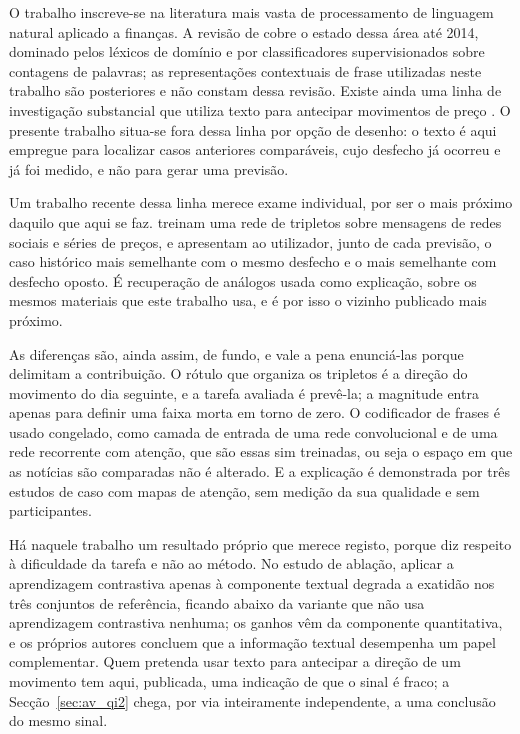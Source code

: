 O trabalho inscreve-se na literatura mais vasta de processamento de linguagem natural aplicado a
finanças. A revisão de \textcite{kearney2014textual} cobre o estado dessa área até 2014, dominado
pelos léxicos de domínio e por classificadores supervisionados sobre contagens de palavras; as
representações contextuais de frase utilizadas neste trabalho são posteriores e não constam dessa
revisão. Existe ainda uma linha de investigação substancial que utiliza texto para antecipar
movimentos de preço \autocite{xing2018nlffsurvey, ding2015deep}. O presente trabalho situa-se fora
dessa linha por opção de desenho: o texto é aqui empregue para localizar casos anteriores
comparáveis, cujo desfecho já ocorreu e já foi medido, e não para gerar uma previsão.

Um trabalho recente dessa linha merece exame individual, por ser o mais próximo daquilo que aqui
se faz. \textcite{du2024contrastive} treinam uma rede de tripletos sobre mensagens de redes
sociais e séries de preços, e apresentam ao utilizador, junto de cada previsão, o caso histórico
mais semelhante com o mesmo desfecho e o mais semelhante com desfecho oposto. É recuperação de
análogos usada como explicação, sobre os mesmos materiais que este trabalho usa, e é por isso o
vizinho publicado mais próximo.

As diferenças são, ainda assim, de fundo, e vale a pena enunciá-las porque delimitam a
contribuição. O rótulo que organiza os tripletos é a direção do movimento do dia seguinte, e a
tarefa avaliada é prevê-la; a magnitude entra apenas para definir uma faixa morta em torno de
zero. O codificador de frases é usado congelado, como camada de entrada de uma rede convolucional
e de uma rede recorrente com atenção, que são essas sim treinadas, ou seja o espaço em que as
notícias são comparadas não é alterado. E a explicação é demonstrada por três estudos de caso com
mapas de atenção, sem medição da sua qualidade e sem participantes.

Há naquele trabalho um resultado próprio que merece registo, porque diz respeito à dificuldade da
tarefa e não ao método. No estudo de ablação, aplicar a aprendizagem contrastiva apenas à
componente textual degrada a exatidão nos três conjuntos de referência, ficando abaixo da variante
que não usa aprendizagem contrastiva nenhuma; os ganhos vêm da componente quantitativa, e os
próprios autores concluem que a informação textual desempenha um papel complementar. Quem
pretenda usar texto para antecipar a direção de um movimento tem aqui, publicada, uma indicação de
que o sinal é fraco; a Secção~\ref{sec:av_qi2} chega, por via inteiramente independente, a uma
conclusão do mesmo sinal.


